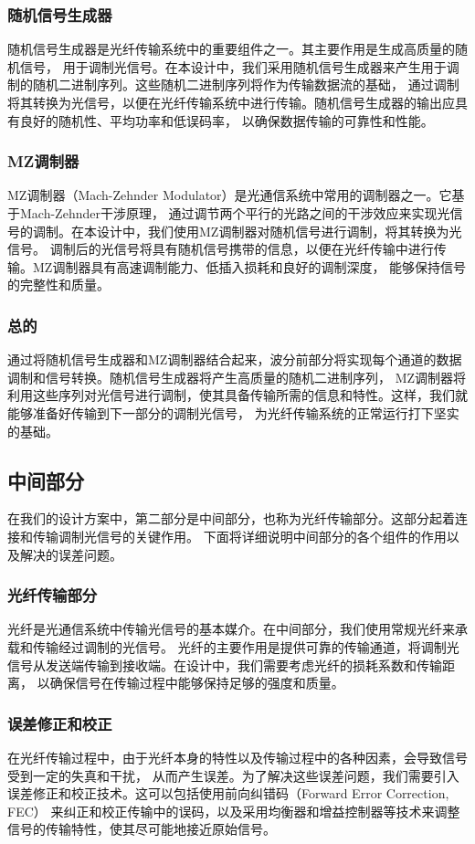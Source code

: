 \documentclass[12pt]{article}
\begin{document}
\subsubsection*{随机信号生成器}
随机信号生成器是光纤传输系统中的重要组件之一。其主要作用是生成高质量的随机信号，
用于调制光信号。在本设计中，我们采用随机信号生成器来产生用于调制的随机二进制序列。这些随机二进制序列将作为传输数据流的基础，
通过调制将其转换为光信号，以便在光纤传输系统中进行传输。随机信号生成器的输出应具有良好的随机性、平均功率和低误码率，
以确保数据传输的可靠性和性能。
\subsubsection*{MZ调制器}
MZ调制器（Mach-Zehnder Modulator）是光通信系统中常用的调制器之一。它基于Mach-Zehnder干涉原理，
通过调节两个平行的光路之间的干涉效应来实现光信号的调制。在本设计中，我们使用MZ调制器对随机信号进行调制，将其转换为光信号。
调制后的光信号将具有随机信号携带的信息，以便在光纤传输中进行传输。MZ调制器具有高速调制能力、低插入损耗和良好的调制深度，
能够保持信号的完整性和质量。
\subsubsection*{总的}
通过将随机信号生成器和MZ调制器结合起来，波分前部分将实现每个通道的数据调制和信号转换。随机信号生成器将产生高质量的随机二进制序列，
MZ调制器将利用这些序列对光信号进行调制，使其具备传输所需的信息和特性。这样，我们就能够准备好传输到下一部分的调制光信号，
为光纤传输系统的正常运行打下坚实的基础。

\subsection{中间部分}
在我们的设计方案中，第二部分是中间部分，也称为光纤传输部分。这部分起着连接和传输调制光信号的关键作用。
下面将详细说明中间部分的各个组件的作用以及解决的误差问题。
\subsubsection*{光纤传输部分}
光纤是光通信系统中传输光信号的基本媒介。在中间部分，我们使用常规光纤来承载和传输经过调制的光信号。
光纤的主要作用是提供可靠的传输通道，将调制光信号从发送端传输到接收端。在设计中，我们需要考虑光纤的损耗系数和传输距离，
以确保信号在传输过程中能够保持足够的强度和质量。
\subsubsection*{误差修正和校正}
在光纤传输过程中，由于光纤本身的特性以及传输过程中的各种因素，会导致信号受到一定的失真和干扰，
从而产生误差。为了解决这些误差问题，我们需要引入误差修正和校正技术。这可以包括使用前向纠错码（Forward Error Correction, FEC）
来纠正和校正传输中的误码，以及采用均衡器和增益控制器等技术来调整信号的传输特性，使其尽可能地接近原始信号。
\end{document}
